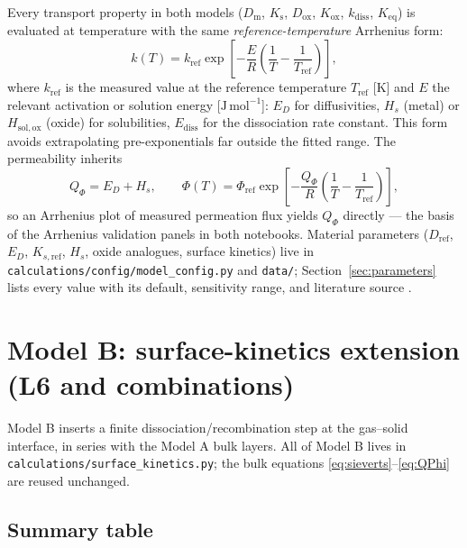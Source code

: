 \documentclass[11pt,a4paper]{article}
\newcommand{\Ks}{K_{\mathrm{s}}}
\newcommand{\Kox}{K_{\mathrm{ox}}}
\newcommand{\Keq}{K_{\mathrm{eq}}}
\newcommand{\Dm}{D_{\mathrm{m}}}
\newcommand{\Dox}{D_{\mathrm{ox}}}
\newcommand{\kdiss}{k_{\mathrm{diss}}}
\newcommand{\code}[1]{\texttt{#1}}
\begin{document}
Every transport property in both models ($\Dm$, $\Ks$, $\Dox$, $\Kox$,
$\kdiss$, $\Keq$) is evaluated at temperature with the same
\emph{reference-temperature} Arrhenius form:
\begin{equation}
  k(T) = k_{\mathrm{ref}} \exp\!\left[-\frac{E}{R}\left(\frac{1}{T} - \frac{1}{T_{\mathrm{ref}}}\right)\right],
  \label{eq:arrhenius}
\end{equation}
where $k_{\mathrm{ref}}$ is the measured value at the reference temperature
$T_{\mathrm{ref}}$ [K] and $E$ the relevant activation or solution energy
[$\mathrm{J\,mol^{-1}}$]: $E_D$ for diffusivities, $H_s$ (metal) or
$H_{\mathrm{sol,ox}}$ (oxide) for solubilities, $E_{\mathrm{diss}}$ for the
dissociation rate constant. This form avoids extrapolating pre-exponentials
far outside the fitted range. The permeability inherits
\begin{equation}
  Q_\Phi = E_D + H_s,
  \qquad \Phi(T) = \Phi_{\mathrm{ref}}
  \exp\!\left[-\frac{Q_\Phi}{R}\left(\frac1T - \frac1{T_{\mathrm{ref}}}\right)\right],
  \label{eq:QPhi}
\end{equation}
so an Arrhenius plot of measured permeation flux yields $Q_\Phi$ directly ---
the basis of the Arrhenius validation panels in both notebooks. Material
parameters ($D_{\mathrm{ref}}$, $E_D$, $K_{s,\mathrm{ref}}$, $H_s$, oxide
analogues, surface kinetics) live in \code{calculations/config/model\_config.py}
and \code{data/}; Section~\ref{sec:parameters} lists every value with its
default, sensitivity range, and literature source
\citep{schmidt1985,nemanic2023,stover1986,chen2011,grant1988,zhu2021}.

\section{Model B: surface-kinetics extension (L6 and combinations)}
\label{sec:modelB}

Model B inserts a finite dissociation/recombination step at the gas--solid
interface, in series with the Model A bulk layers. All of Model B lives in
\code{calculations/surface\_kinetics.py}; the bulk equations
\eqref{eq:sieverts}--\eqref{eq:QPhi} are reused unchanged.

\subsection{Summary table}
\end{document}
